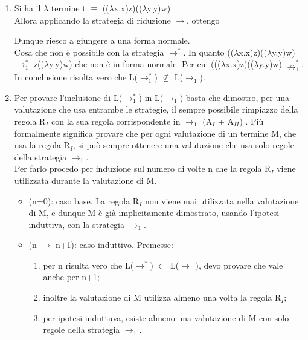 \begin{enumerate}
\item Si ha il $\lambda$ termine t $\equiv$ (($\lambda$x.x)z)(($\lambda$y.y)w)\\
Allora applicando la strategia di riduzione $\rightarrow$, ottengo
\begin{prooftree}
\end{prooftree}
\begin{prooftree}
\end{prooftree}
\noindent Dunque riesco a giungere a una forma normale.\\
Cosa che non \`e possibile con la strategia $\rightarrow_1^\ast$. In quanto (($\lambda$x.x)z)(($\lambda$y.y)w) $\rightarrow_1^\ast$ z(($\lambda$y.y)w)  che non \`e in forma normale. Per cui ((($\lambda$x.x)z)(($\lambda$y.y)w) $\nrightarrow_1^\ast$.\\
In conclusione risulta vero che L($\rightarrow_1^\ast$) $\nsubseteq$ L($\rightarrow_1$).
\item Per provare l'inclusione di L($\rightarrow_1^\ast$) in L($\rightarrow_1$) basta che dimostro, per una valutazione che usa entrambe le strategie, il sempre possibile rimpiazzo della regola R$_I$ con la sua regola corrispondente in $\rightarrow_1$ (A$_I$ + A$_{II}$) . Pi\`u formalmente significa provare che per ogni valutazione di un termine M, che usa la regola R$_I$, si pu\`o sempre ottenere una valutazione che usa solo regole della strategia $\rightarrow_1$.\\ Per farlo procedo per induzione sul numero di volte n che la regola R$_I$ viene utilizzata durante la valutazione di M.
\begin{itemize}
\item (n=0): caso base. La regola R$_I$ non viene mai utilizzata nella valutazione di M, e dunque M \`e gi\`a implicitamente dimostrato, usando l'ipotesi induttiva, con la strategia $\rightarrow_1$.
\item (n $\rightarrow$ n+1): caso induttivo. Premesse:
\begin{enumerate}
\item per n risulta vero che L($\rightarrow_1^\ast$) $\subset$ L($\rightarrow_1$), devo provare che vale anche per n+1;
\item inoltre la valutazione di M utilizza almeno una volta la regola R$_I$;
\item per ipotesi induttuva, esiste almeno una valutazione di M con solo regole della strategia $\rightarrow_1$.

\end{enumerate}
\end{itemize}
\end{enumerate}

